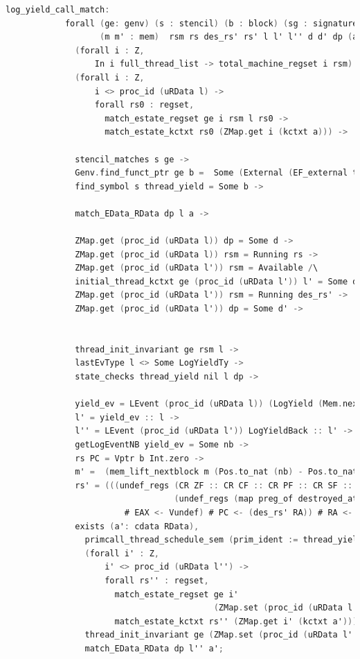 \begin{lstlisting}[language=C]     
          log_yield_call_match:
            forall (ge: genv) (s : stencil) (b : block) (sg : signature) 
                   (m m' : mem)  rsm rs des_rs' rs' l l' l'' d d' dp (a: cdata RData) nb yield_ev,
              (forall i : Z,
                  In i full_thread_list -> total_machine_regset i rsm) ->
              (forall i : Z,
                  i <> proc_id (uRData l) ->
                  forall rs0 : regset,
                    match_estate_regset ge i rsm l rs0 ->
                    match_estate_kctxt rs0 (ZMap.get i (kctxt a))) ->

              stencil_matches s ge ->
              Genv.find_funct_ptr ge b =  Some (External (EF_external thread_yield sg)) ->
              find_symbol s thread_yield = Some b ->
              
              match_EData_RData dp l a ->
              
              ZMap.get (proc_id (uRData l)) dp = Some d ->
              ZMap.get (proc_id (uRData l)) rsm = Running rs ->
              ZMap.get (proc_id (uRData l')) rsm = Available /\
              initial_thread_kctxt ge (proc_id (uRData l')) l' = Some des_rs' \/
              ZMap.get (proc_id (uRData l')) rsm = Running des_rs' ->
              ZMap.get (proc_id (uRData l')) dp = Some d' ->


              thread_init_invariant ge rsm l ->
              lastEvType l <> Some LogYieldTy ->
              state_checks thread_yield nil l dp ->

              yield_ev = LEvent (proc_id (uRData l)) (LogYield (Mem.nextblock m)) ->
              l' = yield_ev :: l ->
              l'' = LEvent (proc_id (uRData l')) LogYieldBack :: l' ->
              getLogEventNB yield_ev = Some nb ->
              rs PC = Vptr b Int.zero ->
              m' =  (mem_lift_nextblock m (Pos.to_nat (nb) - Pos.to_nat (Mem.nextblock m) % nat)) ->
              rs' = (((undef_regs (CR ZF :: CR CF :: CR PF :: CR SF :: CR OF :: nil)
                                  (undef_regs (map preg_of destroyed_at_call) des_rs'))
                        # EAX <- Vundef) # PC <- (des_rs' RA)) # RA <- Vundef ->
              exists (a': cdata RData),
                primcall_thread_schedule_sem (prim_ident := thread_yield) big_thread_yield_spec s rs (m, a) rs' (m', a') /\
                (forall i' : Z,
                    i' <> proc_id (uRData l'') ->
                    forall rs'' : regset,
                      match_estate_regset ge i'
                                          (ZMap.set (proc_id (uRData l'')) (Running rs') rsm) l'' rs'' ->
                      match_estate_kctxt rs'' (ZMap.get i' (kctxt a'))) /\
                thread_init_invariant ge (ZMap.set (proc_id (uRData l'')) (Running rs') rsm) l'' /\
                match_EData_RData dp l'' a';
\end{lstlisting}
         
